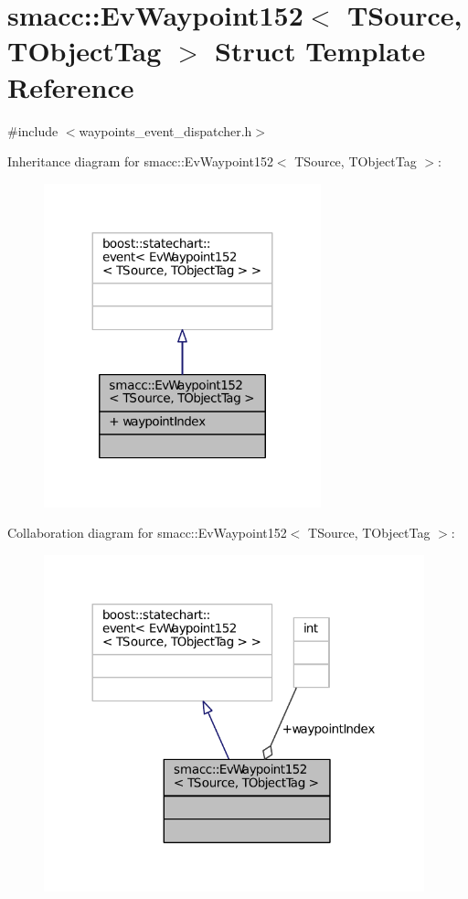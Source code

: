 \hypertarget{structsmacc_1_1EvWaypoint152}{}\section{smacc\+:\+:Ev\+Waypoint152$<$ T\+Source, T\+Object\+Tag $>$ Struct Template Reference}
\label{structsmacc_1_1EvWaypoint152}


{\ttfamily \#include $<$waypoints\+\_\+event\+\_\+dispatcher.\+h$>$}



Inheritance diagram for smacc\+:\+:Ev\+Waypoint152$<$ T\+Source, T\+Object\+Tag $>$\+:
\nopagebreak
\begin{figure}[H]
\begin{center}
\leavevmode
\includegraphics[width=227pt]{structsmacc_1_1EvWaypoint152__inherit__graph}
\end{center}
\end{figure}


Collaboration diagram for smacc\+:\+:Ev\+Waypoint152$<$ T\+Source, T\+Object\+Tag $>$\+:
\nopagebreak
\begin{figure}[H]
\begin{center}
\leavevmode
\includegraphics[width=312pt]{structsmacc_1_1EvWaypoint152__coll__graph}
\end{center}
\end{figure}
